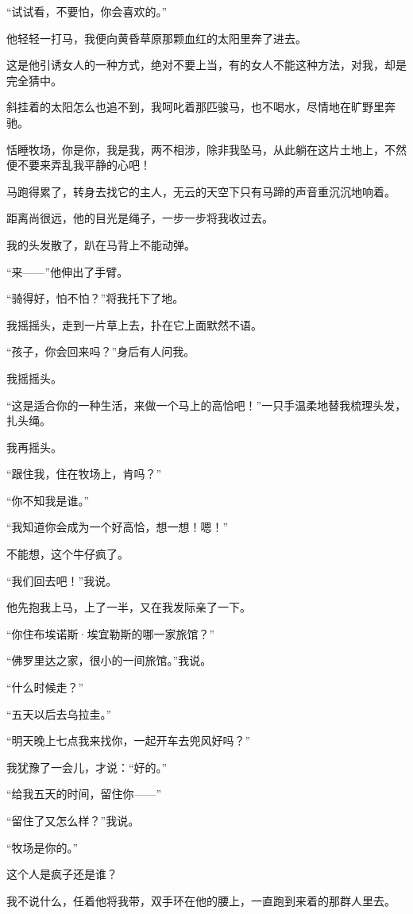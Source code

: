 \par “试试看，不要怕，你会喜欢的。”
\par 他轻轻一打马，我便向黄昏草原那颗血红的太阳里奔了进去。
\par 这是他引诱女人的一种方式，绝对不要上当，有的女人不能这种方法，对我，却是完全猜中。
\par 斜挂着的太阳怎么也追不到，我呵叱着那匹骏马，也不喝水，尽情地在旷野里奔驰。
\par 恬睡牧场，你是你，我是我，两不相涉，除非我坠马，从此躺在这片土地上，不然便不要来弄乱我平静的心吧！
\par 马跑得累了，转身去找它的主人，无云的天空下只有马蹄的声音重沉沉地响着。
\par 距离尚很远，他的目光是绳子，一步一步将我收过去。
\par 我的头发散了，趴在马背上不能动弹。
\par “来——”他伸出了手臂。
\par “骑得好，怕不怕？”将我托下了地。
\par 我摇摇头，走到一片草上去，扑在它上面默然不语。
\par “孩子，你会回来吗？”身后有人问我。
\par 我摇摇头。
\par “这是适合你的一种生活，来做一个马上的高恰吧！”一只手温柔地替我梳理头发，扎头绳。
\par 我再摇头。
\par “跟住我，住在牧场上，肯吗？”
\par “你不知我是谁。”
\par “我知道你会成为一个好高恰，想一想！嗯！”
\par 不能想，这个牛仔疯了。
\par “我们回去吧！”我说。
\par 他先抱我上马，上了一半，又在我发际亲了一下。
\par “你住布埃诺斯·埃宜勒斯的哪一家旅馆？”
\par “佛罗里达之家，很小的一间旅馆。”我说。
\par “什么时候走？”
\par “五天以后去乌拉圭。”
\par “明天晚上七点我来找你，一起开车去兜风好吗？”
\par 我犹豫了一会儿，才说：“好的。”
\par “给我五天的时间，留住你——”
\par “留住了又怎么样？”我说。
\par “牧场是你的。”
\par 这个人是疯子还是谁？
\par 我不说什么，任着他将我带，双手环在他的腰上，一直跑到来着的那群人里去。
